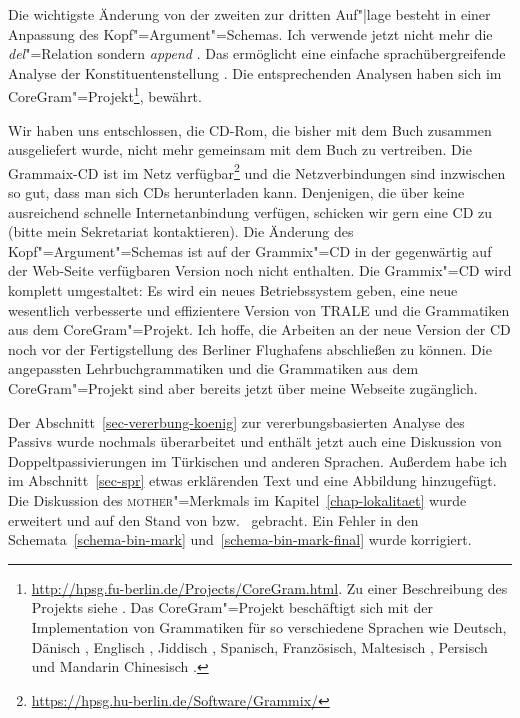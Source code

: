 Die wichtigste Änderung von der zweiten zur dritten Auf"|lage besteht in einer Anpassung des
Kopf"=Argument"=Schemas. Ich verwende jetzt nicht mehr die \emph{del}"=Relation sondern
\emph{append} \citep[Abschnitt~8.4]{MuellerGTBuch1}. Das ermöglicht eine einfache sprachübergreifende Analyse der Konstituentenstellung
\citep{MuellerCopula}. Die entsprechenden Analysen haben sich im CoreGram"=Projekt\footnote{
  \url{http://hpsg.fu-berlin.de/Projects/CoreGram.html}. Zu einer Beschreibung des Projekts siehe . Das CoreGram"=Projekt beschäftigt sich mit der Implementation von Grammatiken für so
verschiedene Sprachen wie Deutsch, Dänisch
\citep{MOe2011a,MuellerPredication,MuellerCopula,MOeDanish}, Englisch
\citep{MuellerPredication,MuellerCopula}, Jiddisch \citep{MOe2011a}, Spanisch, Französisch,
Maltesisch \citep{MuellerMalteseSketch},
Persisch \citep{MuellerPersian} und Mandarin Chinesisch \citep{Lipenkova2009a,ML2009a}.
}, bewährt. 

Wir haben uns entschlossen, die CD-Rom, die bisher mit dem Buch zusammen ausgeliefert wurde, nicht
mehr gemeinsam mit dem Buch zu vertreiben. Die Grammaix-CD \citep{Mueller2007b} ist im Netz verfügbar\footnote{
  \url{https://hpsg.hu-berlin.de/Software/Grammix/}
} und die Netzverbindungen sind inzwischen so gut, dass man sich CDs herunterladen kann. Denjenigen,
die über keine ausreichend schnelle Internetanbindung verfügen, schicken wir gern eine CD zu (bitte
mein Sekretariat kontaktieren). 
Die Änderung des Kopf"=Argument"=Schemas ist auf der Grammix"=CD in der gegenwärtig auf der
Web-Seite verfügbaren Version noch nicht enthalten. Die Grammix"=CD
wird komplett umgestaltet: Es wird ein neues Betriebssystem geben, eine neue wesentlich verbesserte
und effizientere Version von TRALE und die Grammatiken aus dem CoreGram"=Projekt. Ich hoffe, die
Arbeiten an der neue Version der CD noch vor der Fertigstellung des Berliner Flughafens abschließen
zu können. Die angepassten Lehrbuchgrammatiken und die Grammatiken aus dem CoreGram"=Projekt sind
aber bereits jetzt über meine Webseite zugänglich.

Der Abschnitt~\ref{sec-vererbung-koenig} zur vererbungsbasierten Analyse des Passivs wurde nochmals
überarbeitet und enthält jetzt auch eine Diskussion von Doppeltpassivierungen im Türkischen und
anderen Sprachen. Außerdem habe ich im Abschnitt~\ref{sec-spr} etwas erklärenden Text und eine
Abbildung hinzugefügt. Die Diskussion des \textsc{mother}"=Merkmals im Kapitel~\ref{chap-lokalitaet} wurde erweitert und auf
den Stand von  bzw.\  gebracht. 
Ein Fehler in den Schemata~\ref{schema-bin-mark} und~\ref{schema-bin-mark-final} wurde korrigiert.

